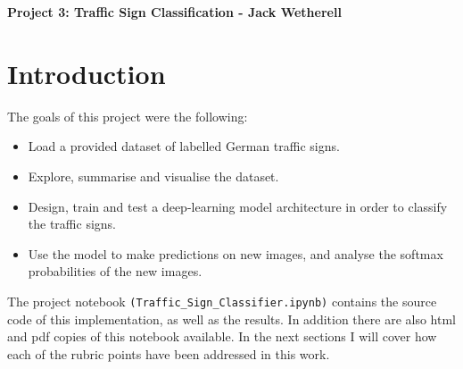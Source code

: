 \documentclass[letterpaper,12pt]{article}
\begin{document}
\title{}
\author{}
\date{}


\begin{center}
\textbf{Project 3: Traffic Sign Classification - Jack Wetherell} \\
\end{center}


\section{Introduction}
The goals of this project were the following:
\begin{itemize}
\item Load a provided dataset of labelled German traffic signs.
\item Explore, summarise  and visualise the dataset.
\item Design, train and test a deep-learning model architecture in order to classify the traffic signs.
\item Use the model to make predictions on new images, and  analyse the softmax probabilities of the new images.
\end{itemize}
The project notebook \texttt{(Traffic\_Sign\_Classifier.ipynb)} contains the source code of this implementation, as well as the results. In addition there are also html and pdf copies of this notebook available. 
In the next sections I will cover how each of the rubric points have been addressed in this work.
\end{document}
